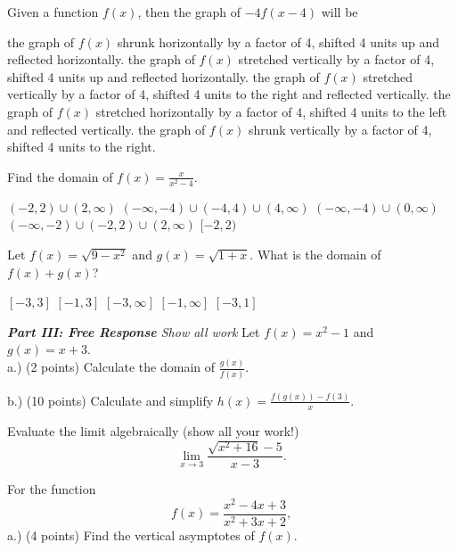 \documentclass[11pt]{article}
\begin{document}
\begin{questions}
\begin{multiplechoice}{5}
\nextpage

\question Given a function $f(x)$, then the graph of $-4f(x-4)$ will be
\begin{answers}{2}
\ans the graph of $f(x)$ shrunk horizontally by a factor of 4, shifted 4 units up and reflected horizontally.
\ans the graph of $f(x)$ stretched vertically by a factor of 4, shifted 4 units up and reflected horizontally.
\ans the graph of $f(x)$ stretched vertically by a factor of 4, shifted 4 units to the right and reflected vertically.
\ans the graph of $f(x)$ stretched horizontally by a factor of 4, shifted 4 units to the left and reflected vertically.
\ans the graph of $f(x)$ shrunk vertically by a factor of 4, shifted 4 units to the right.
\end{answers}

\question Find the domain of $f(x) = \frac{x}{x^2-4}$.
\begin{answers}{2}
\ans $(-2,2) \cup (2, \infty)$
\ans $(-\infty, -4) \cup (-4,4) \cup (4, \infty) $
\ans  $(-\infty, -4) \cup (0, \infty)$
\ans  $(-\infty, -2) \cup (-2,2) \cup (2, \infty)$
\ans $[-2,2)$
\end{answers}


\question Let $f(x) = \sqrt{9-x^2}$ and $g(x)=\sqrt{1+x}$.  What is the domain of $f(x)+g(x)$?
\begin{answers}{2}
\ans $[-3,3]$
\ans $[-1,3]$
\ans $[-3,\infty]$
\ans $[-1,\infty]$
\ans $[-3,1]$
\end{answers}

\end{multiplechoice}
\vspace{.2in}

\nextpage
\noindent \emph{{\bf Part III: Free Response}{  Show all work}}
\question[12] Let $f(x)=x^2-1$ and $g(x) = x+3$.\\

a.) (2 points) Calculate the domain of $\frac{g(x)}{f(x)}$.
\vspace{1.25in}

b.) (10 points) Calculate and simplify $h(x) = \frac{f(g(x))-f(3)}{x}$.
\vspace{2.25in}




\question[10] Evaluate the limit algebraically (show all your work!)
\[\lim_{x\to 3} \frac{\sqrt{x^2+16} - 5}{x-3}.\]
\vspace{3.25in}

\question[8] For the function 
\[f(x) = \frac{x^2-4x+3}{x^2+3x+2},\]
a.) (4 points) Find the vertical asymptotes of $f(x)$.
\vspace{2.25in}


\end{questions}
\end{document}
